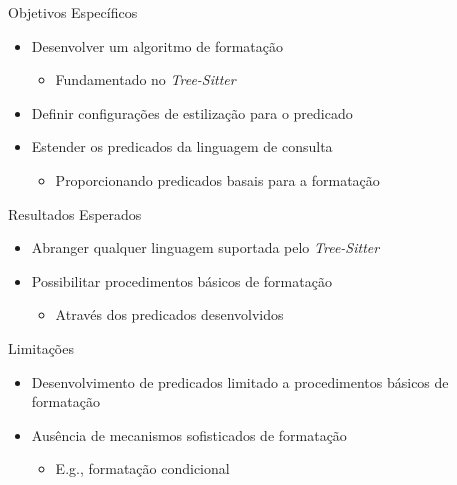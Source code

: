 \documentclass
  [ aspectratio=169,
    english,
    hyperref={citecolor=blue,colorlinks=true,linkcolor=blue,urlcolor=blue},
    brazil]
  {beamer}
\newcommand{\treesitter}{\textit{Tree-Sitter}\xspace}
\begin{document}
  \begin{frame}[fragile]{Objetivos Específicos}
    \begin{itemize}
      \item Desenvolver um algoritmo de formatação
            \begin{itemize}
              \item Fundamentado no \treesitter
            \end{itemize}
      \item Definir configurações de estilização para o predicado
      \item Estender os predicados da linguagem de consulta
            \begin{itemize}
              \item Proporcionando predicados basais para a formatação
            \end{itemize}
    \end{itemize}
  \end{frame}


  \begin{frame}{Resultados Esperados}
    \begin{itemize}
      \item Abranger qualquer linguagem suportada pelo \treesitter
      \item Possibilitar procedimentos básicos de formatação
            \begin{itemize}
              \item Através dos predicados desenvolvidos
            \end{itemize}
    \end{itemize}
  \end{frame}


  \begin{frame}{Limitações}
    \begin{itemize}
      \item Desenvolvimento de predicados limitado a procedimentos básicos de
            formatação
      \item Ausência de mecanismos sofisticados de formatação
            \begin{itemize}
              \item E.g., formatação condicional
            \end{itemize}
    \end{itemize}
  \end{frame}
\end{document}
